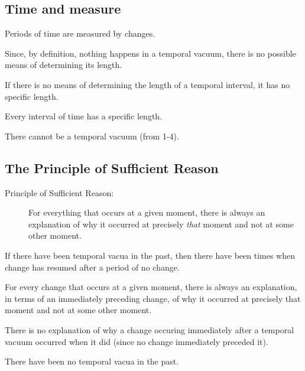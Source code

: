\documentclass[oneside]{article}
\begin{document}
\subsection{Time and measure}
\begin{enumerate*}
\item Periods of time are measured by changes. 
\item Since, by definition, nothing happens in a temporal vacuum, there is no possible means of determining its length. 
\item If there is no means of determining the length of a temporal interval, it has no specific length. 
\item Every interval of time has a specific length. 
\item There cannot be a temporal vacuum (from 1-4). 

\end{enumerate*}


\subsection{The Principle of Sufficient Reason}
\begin{description}
\item[Principle of Sufficient Reason:] For everything that occurs at a given moment, there is always an explanation of why it occurred at precisely \emph{that} moment and not at some other moment.
\end{description} 

\begin{enumerate*}
\item If there have been temporal vacua in the past, then there have been times when change has resumed after a period of no change. 
\item For every change that occurs at a given moment, there is always an explanation, in terms of an immediately preceding change, of why it occurred at precisely that moment and not at some other moment. 
\item There is no explanation of why a change occuring immediately after a temporal vacuum occurred when it did (since no change immediately preceded it). 
\item There have been no temporal vacua in the past. 
\end{enumerate*}
\end{document}

